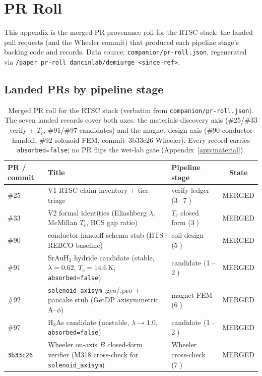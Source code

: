 \section{PR Roll}
\label{app:prroll}

This appendix is the merged-PR provenance roll for the RTSC stack: the
landed pull requests (and the Wheeler commit) that produced each pipeline
stage's backing code and records. Data source:
\texttt{companion/pr-roll.json}, regenerated via
\texttt{/paper pr-roll dancinlab/demiurge <since-ref>}.

\subsection{Landed PRs by pipeline stage}
\label{app:pr-table}

\begin{table}[h]
\centering
\small
\setlength{\tabcolsep}{4pt}
\begin{tabular}{@{}l >{\raggedright\arraybackslash}m{6.0cm} l c@{}}
\toprule
\textbf{PR / commit} & \textbf{Title} & \textbf{Pipeline stage} & \textbf{State} \\
\midrule
\#25 & V1 RTSC claim inventory + tier triage & verify-ledger
  (\textcircled{\scriptsize 3}--\textcircled{\scriptsize 7}) & MERGED \\
\#33 & V2 formal identities (Eliashberg $\lambda$, McMillan $T_c$, BCS gap
  ratio) & $T_c$ closed form (\textcircled{\scriptsize 3}) & MERGED \\
\#90 & conductor handoff schema stub (HTS REBCO baseline) & coil design
  (\textcircled{\scriptsize 5}) & MERGED \\
\#91 & SrAuH$_3$ hydride candidate (stable, $\lambda{=}0.62$,
  $T_c{=}14.6$\,K, \texttt{absorbed=false}) & candidate
  (\textcircled{\scriptsize 1}--\textcircled{\scriptsize 2}) & MERGED \\
\#92 & \texttt{solenoid\_axisym} .geo/.pro + pancake stub (GetDP
  axisymmetric A--$\phi$) & magnet FEM (\textcircled{\scriptsize 6}) & MERGED \\
\#97 & H$_3$As candidate (unstable, $\lambda{\to}1.0$,
  \texttt{absorbed=false}) & candidate
  (\textcircled{\scriptsize 1}--\textcircled{\scriptsize 2}) & MERGED \\
\texttt{3b33c26} & Wheeler on-axis $B$ closed-form verifier (M318
  cross-check for \texttt{solenoid\_axisym}) & Wheeler cross-check
  (\textcircled{\scriptsize 7}) & MERGED \\
\bottomrule
\end{tabular}
\caption{Merged PR roll for the RTSC stack (verbatim from
\texttt{companion/pr-roll.json}). The seven landed records cover both axes:
the materials-discovery axis (\#25/\#33 verify + $T_c$, \#91/\#97
candidates) and the magnet-design axis (\#90 conductor handoff, \#92
solenoid FEM, commit~3b33c26 Wheeler). Every record carries
\texttt{absorbed=false}; no PR flips the wet-lab gate (Appendix~\ref{app:material}).}
\label{tab:pr-roll}
\end{table}

